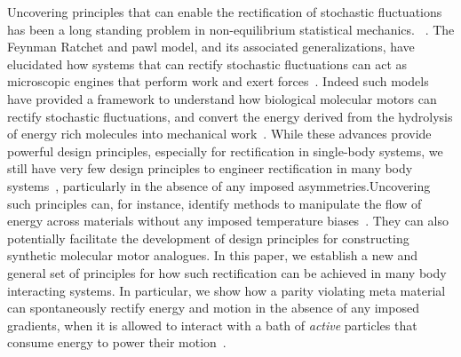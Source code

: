\documentclass[
 preprint,
 preprintnumbers,
 amsmath,amssymb,
 aps,
 pre,
 longbibliography,
 superscriptaddress,
 10pt, twocolumn
]{revtex4-1}
\begin{document}

Uncovering principles that can enable the rectification of stochastic fluctuations has been a long standing problem in non-equilibrium statistical mechanics. ~\cite{Seifert2012StochasticThermodynamics,Coskun2011GreatExpectations}. The Feynman Ratchet and pawl model, and its associated generalizations, have elucidated how systems that can rectify stochastic fluctuations can act as microscopic engines that perform work and exert forces~\cite{Jarzynski1999FeynmanRatchet}. Indeed such models have provided a framework to understand how biological molecular motors can rectify stochastic fluctuations, and convert the energy derived from the hydrolysis of energy rich molecules into mechanical work~\cite{Mogilner1996CellMotility,Chernyak2008PumpingRestriction,Rahav2008DirectedFlow,Sinitsyn2007UniversalGeometric}. While these advances provide powerful design principles, especially for rectification in single-body systems, we still have very few design principles to engineer rectification in many body systems~\cite{Seifert2012StochasticThermodynamics}, particularly in the absence of any imposed asymmetries.Uncovering such principles can, for instance, identify methods to manipulate the flow of energy across materials without any imposed temperature biases~\cite{Dubi2011ColloquiumHeat,Strohm2005PhenomenologicalEvidence,Li2012ColloquiumPhononics,Kanazawa2013HeatConduction,Morgado2016ThermostatisticsSmall,Martinez2017ColloidalHeat}. They can also potentially facilitate the development of design principles for constructing synthetic molecular motor analogues. In this paper, we establish a new and general set of principles for how such rectification can be achieved in many body interacting systems. In particular, we show how a parity violating meta material~\cite{Nash2015TopologicalMechanics} can spontaneously rectify energy and motion in the absence of any imposed gradients, when it is allowed to interact with a bath of \textit{active} particles that consume energy to power their motion~\cite{Marchetti2013HydrodynamicsSoft,Souslov2017TopologicalSound,Shankar2017TopologicalSound}. 

\end{document}
